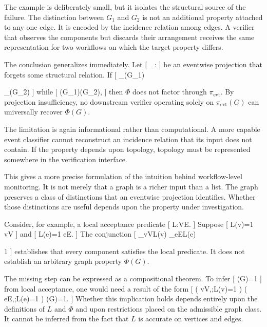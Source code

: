 \documentclass[11pt]{article}
\begin{document}
The example is deliberately small, but it isolates the structural source of the failure. The distinction between $G_1$ and $G_2$ is not an additional property attached to any one edge. It is encoded by the incidence relation among edges. A verifier that observes the components but discards their arrangement receives the same representation for two workflows on which the target property differs.

The conclusion generalizes immediately. Let
[
\pi_{}:\rightarrow{}
]
be an eventwise projection that forgets some structural relation. If
[
\pi_{}(G_1)

\pi_{}(G_2)
]
while
[
\Phi(G_1)\neq\Phi(G_2),
]
then $\Phi$ does not factor through $\pi_{\mathrm{evt}}$. By projection insufficiency, no downstream verifier operating solely on $\pi_{\mathrm{evt}}(G)$ can universally recover $\Phi(G)$.

The limitation is again informational rather than computational. A more capable event classifier cannot reconstruct an incidence relation that its input does not contain. If the property depends upon topology, topology must be represented somewhere in the verification interface.

This gives a more precise formulation of the intuition behind workflow-level monitoring. It is not merely that a graph is a richer input than a list. The graph preserves a class of distinctions that an eventwise projection identifies. Whether those distinctions are useful depends upon the property under investigation.

Consider, for example, a local acceptance predicate
[
L:V\cup E.
]
Suppose
[
L(v)=1
\qquad
{}v\in V
]
and
[
L(e)=1
\qquad
{}e\in E.
]
The conjunction
[
\bigwedge_{v\in V}L(v)
\wedge
\bigwedge_{e\in E}L(e)

1
]
establishes that every component satisfies the local predicate. It does not establish an arbitrary graph property $\Phi(G)$.

The missing step can be expressed as a compositional theorem. To infer
[
\Phi(G)=1
]
from local acceptance, one would need a result of the form
[
\left(
\forall v\in V,;L(v)=1
\right)
\land
\left(
\forall e\in E,;L(e)=1
\right)
\Longrightarrow
\Phi(G)=1.
]
Whether this implication holds depends entirely upon the definitions of $L$ and $\Phi$ and upon restrictions placed on the admissible graph class. It cannot be inferred from the fact that $L$ is accurate on vertices and edges.
\end{document}
